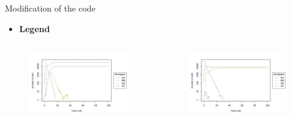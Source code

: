 \begin{frame}{Modification of the code}
\begin{itemize}
        \item \textbf{Legend}
\end{itemize}
\begin{columns}
        \begin{column}{0.5\textwidth}
            \begin{figure}[t]
                \includegraphics[width=0.9\linewidth]{img/scenario1_tr.jpg}
            \end{figure}
        \end{column}
        \begin{column}{0.5\textwidth}
            \begin{figure}[t]
                \includegraphics[width=0.9\linewidth]{img/scenario2_tr.jpg}
            \end{figure}
        \end{column}
    \end{columns}
\end{frame}